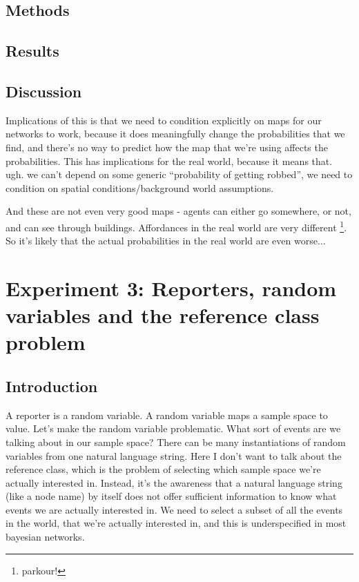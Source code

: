 \subsection{Methods}

\subsection{Results}

\subsection{Discussion}
Implications of this is that we need to condition explicitly on maps for our networks to work, because it does meaningfully change the probabilities that we find, and there's no way to predict how the map that we're using affects the probabilities. This has implications for the real world, because it means that. ugh. we can't depend on some generic ``probability of getting robbed'', we need to condition on spatial conditions/background world assumptions.

And these are not even very good maps - agents can either go somewhere, or not, and can see through buildings. Affordances in the real world are very different \footnote{parkour!}. So it's likely that the actual probabilities in the real world are even worse...

\section{Experiment 3: Reporters, random variables and the reference class problem}

\subsection{Introduction}
A reporter is a random variable. A random variable maps a sample space to value. Let's make the random variable problematic. What sort of events are we talking about in our sample space? There can be many instantiations of random variables from one natural language string. Here I don't want to talk about the reference class, which is the problem of selecting which sample space we're actually interested in. Instead, it's the awareness that a natural language string (like a node name) by itself does not offer sufficient information to know what events we are actually interested in. We need to select a subset of all the events in the world, that we're actually interested in, and this is underspecified in most bayesian networks.

